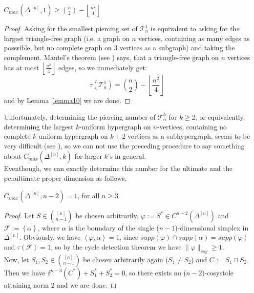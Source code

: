\begin{thm}\label{theorem10}
\(C_{max}(\Delta^{[n]},1)\geq\binom{n}{2}-\left\lfloor\frac{n^2}{4}\right\rfloor\)
\begin{proof}
Asking for the smallest piercing set of \(\mathcal{T}_n^1\) is equivalent to asking for the largest triangle-free graph (i.e. a graph on \(n\) vertices, containing as many edges as posssible, but no complete graph on \(3\) vertices as a subgraph) and taking the complement. Mantel's theorem (see \cite{7}) says, that a triangle-free graph on \(n\) vertices has at most \(\left\lfloor\frac{n^2}{4}\right\rfloor\) edges, so we immediately get:
\[
\tau(\mathcal{T}_n^1)=\binom{n}{2}-\left\lfloor\frac{n^2}{4}\right\rfloor
\]
and by Lemma \ref{lemma10} we are done.
\end{proof}
\end{thm}

Unfortunately, determining the piercing number of \(\mathcal{T}_n^k\) for \(k\geq 2\), or equivalently, determining the largest \(k\)-uniform hypergraph on \(n\)-vertices, containing no complete \(k\)-uniform hypergraph on \(k+2\) vertices as a subhypergraph, seems to be very difficult (see \cite{7}), so we can not use the preceding procedure to say something about \(C_{max}(\Delta^{[n]},k)\) for larger \(k\)'s in general.\\
Eventhough, we can exactly determine this number for the ultimate and the penultimate proper dimension as follows.

\begin{thm}\label{theorem7}
\(C_{max}(\Delta^{[n]},n-2)=1\), for all \(n\geq 3\)
\begin{proof}
Let \(S\in\binom{[n]}{n-1}\) be chosen arbitrarily, \(\varphi:=S^*\in C^{n-2}(\Delta^{[n]})\) and\\
\(\mathcal{F}:=\left\{\alpha\right\}\), where \(\alpha\) is the boundary of the single (\(n-1\))-dimensional simplex in \(\Delta^{[n]}\). Obviously, we have \(\left\langle\varphi,\alpha\right\rangle=1\), since \(supp(\varphi)\cap supp(\alpha)=supp(\varphi)\) and \(\tau(\mathcal{F})=1\), so by the cycle detection theorem we have \(\|\varphi\|_{csy}\geq 1\).\\
Now, let \(S_1,S_2\in\binom{[n]}{n-1}\) be chosen arbitrarily again (\(S_1\neq S_2\)) and \(C:=S_1\cap S_2\). Then we have \(\delta^{n-3}(C^*)+S_1^*+S_2^*=0\), so there exists no (\(n-2\))-cosystole attaining norm \(2\) and we are done.
\end{proof}
\end{thm}

